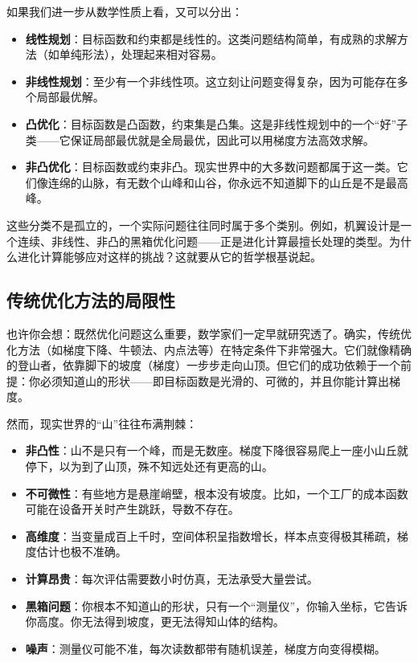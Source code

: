 \documentclass[lang=cn,zihao=-4,a4paper,fontset=windows]{beautybook}
\begin{document}
如果我们进一步从数学性质上看，又可以分出：

\begin{itemize}
    \item \textbf{线性规划}：目标函数和约束都是线性的。这类问题结构简单，有成熟的求解方法（如单纯形法），处理起来相对容易。
    \item \textbf{非线性规划}：至少有一个非线性项。这立刻让问题变得复杂，因为可能存在多个局部最优解。
    \item \textbf{凸优化}：目标函数是凸函数，约束集是凸集。这是非线性规划中的一个“好”子类——它保证局部最优就是全局最优，因此可以用梯度方法高效求解。
    \item \textbf{非凸优化}：目标函数或约束非凸。现实世界中的大多数问题都属于这一类。它们像连绵的山脉，有无数个山峰和山谷，你永远不知道脚下的山丘是不是最高峰。
\end{itemize}

这些分类不是孤立的，一个实际问题往往同时属于多个类别。例如，机翼设计是一个连续、非线性、非凸的黑箱优化问题——正是进化计算最擅长处理的类型。为什么进化计算能够应对这样的挑战？这就要从它的哲学根基说起。

\subsection{传统优化方法的局限性}

也许你会想：既然优化问题这么重要，数学家们一定早就研究透了。确实，传统优化方法（如梯度下降、牛顿法、内点法等）在特定条件下非常强大。它们就像精确的登山者，依靠脚下的坡度（梯度）一步步走向山顶。但它们的成功依赖于一个前提：你必须知道山的形状——即目标函数是光滑的、可微的，并且你能计算出梯度。

然而，现实世界的“山”往往布满荆棘：

\begin{itemize}
    \item \textbf{非凸性}：山不是只有一个峰，而是无数座。梯度下降很容易爬上一座小山丘就停下，以为到了山顶，殊不知远处还有更高的山。
    \item \textbf{不可微性}：有些地方是悬崖峭壁，根本没有坡度。比如，一个工厂的成本函数可能在设备开关时产生跳跃，导数不存在。
    \item \textbf{高维度}：当变量成百上千时，空间体积呈指数增长，样本点变得极其稀疏，梯度估计也极不准确。
    \item \textbf{计算昂贵}：每次评估需要数小时仿真，无法承受大量尝试。
    \item \textbf{黑箱问题}：你根本不知道山的形状，只有一个“测量仪”，你输入坐标，它告诉你高度。你无法得到坡度，更无法得知山体的结构。
    \item \textbf{噪声}：测量仪可能不准，每次读数都带有随机误差，梯度方向变得模糊。
\end{itemize}
\end{document}
